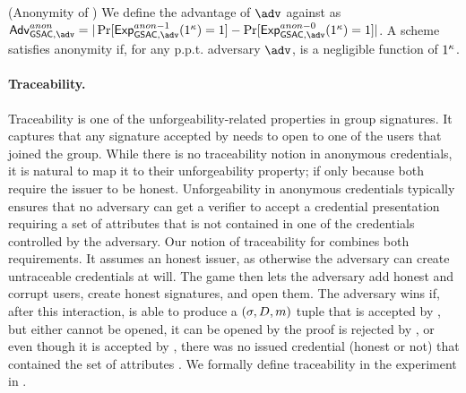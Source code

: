 \begin{definition}{(Anonymity of \GSAC)}
  We define the advantage \AdvAnon of $\adv$ against \ExpAnonb as
  $\AdvAnon=|\Pr\lbrack\ExpAnono(1^\secpar)=1\rbrack-
  \Pr\lbrack\ExpAnonz(1^\secpar)=1\rbrack|$.
  A \GSAC scheme satisfies anonymity if, for any p.p.t. adversary $\adv$,
  \AdvAnon is a negligible function of $1^\kappa$.
\end{definition}

\paragraph{Traceability.} %
Traceability is one of the unforgeability-related properties in group
signatures. It captures that any signature accepted by \Verify needs to open
to one of the users that joined the group. While there is no traceability notion
in anonymous credentials, it is natural to map it to their unforgeability
property; if only because both require the issuer to be honest. Unforgeability
in anonymous credentials typically ensures that no adversary can get a verifier
to accept a credential presentation requiring a set of attributes that is not
contained in one of the credentials controlled by the adversary.
%
Our notion of traceability for \GSAC combines both requirements. It assumes an
honest issuer, as otherwise the adversary can create untraceable credentials at
will. The game then lets the adversary add honest and corrupt users, create
honest signatures, and open them. The adversary wins if, after this interaction,
is able to produce a $(\sigma,D,m)$ tuple that is accepted by \Verify,
but either cannot be opened, it can be opened by the proof is rejected by
\Judge, or even though it is accepted by \Judge, there was no issued credential
(honest or not) that contained the set of attributes \DAttrs. We formally
define traceability in the \ExpTrace experiment in .

